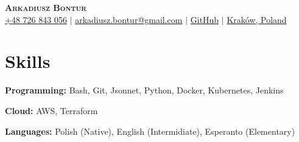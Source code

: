 \documentclass[letterpaper,11pt]{article}
\newcommand{\resumeSubHeadingListStart}{\begin{itemize}[leftmargin=0.15in, label={}]}
\newcommand{\resumeSubHeadingListEnd}{\end{itemize}}
\begin{document}

\begin{center}
    \textbf{\Huge \scshape Arkadiusz Bontur} \\ \vspace{3pt}
    \small
    \faMobile \hspace{.5pt} \href{tel:48726843056}{+48 726 843 056}
    $|$
    \faAt \hspace{.5pt} \href{mailto:arkadiusz.bontur@gmail.com}{arkadiusz.bontur@gmail.com}
    $|$
    \faGithub \hspace{.5pt} \href{https://github.com/abontur}{GitHub}
    $|$
    \faMapMarker \hspace{.5pt} \href{https://maps.app.goo.gl/ySmADKbwRzdAA9jg7}{Kraków, Poland}
\end{center}




\section{Skills}
  \vspace{2pt}
  \resumeSubHeadingListStart
    \small{\item{
        \textbf{Programming:}{ Bash, Git, Jsonnet, Python, Docker, Kubernetes, Jenkins} \\ \vspace{3pt}

        \textbf{Cloud:}{ AWS, Terraform} \\ \vspace{3pt}
        
        
        \textbf{Languages:}{ Polish (Native), English (Intermidiate), Esperanto (Elementary)}
        
    }}
  \resumeSubHeadingListEnd
\end{document}
